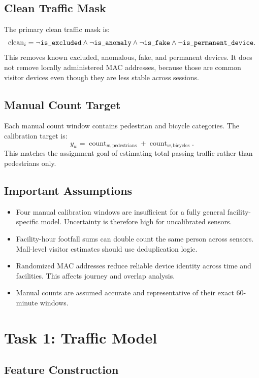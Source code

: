 \documentclass[11pt,a4paper]{article}
\newcommand{\qualitymask}{\ensuremath{\neg\text{\texttt{is\_excluded}}\wedge\neg\text{\texttt{is\_anomaly}}\wedge\neg\text{\texttt{is\_fake}}\wedge\neg\text{\texttt{is\_permanent\_device}}}}
\begin{document}
\subsection{Clean Traffic Mask}

The primary clean traffic mask is:
\[
  \text{clean}_i = \qualitymask.
\]
This removes known excluded, anomalous, fake, and permanent devices. It does not remove locally administered MAC addresses, because those are common visitor devices even though they are less stable across sessions.

\subsection{Manual Count Target}

Each manual count window contains pedestrian and bicycle categories. The calibration target is:
\[
  y_w = \operatorname{count}_{w,\text{pedestrians}} + \operatorname{count}_{w,\text{bicycles}}.
\]
This matches the assignment goal of estimating total passing traffic rather than pedestrians only.

\subsection{Important Assumptions}

\begin{itemize}
  \item Four manual calibration windows are insufficient for a fully general facility-specific model. Uncertainty is therefore high for uncalibrated sensors.
  \item Facility-hour footfall sums can double count the same person across sensors. Mall-level visitor estimates should use deduplication logic.
  \item Randomized MAC addresses reduce reliable device identity across time and facilities. This affects journey and overlap analysis.
  \item Manual counts are assumed accurate and representative of their exact 60-minute windows.
\end{itemize}

\section{Task 1: Traffic Model}

\subsection{Feature Construction}
\end{document}

